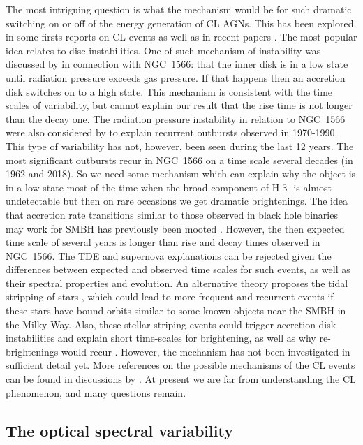 \documentclass[fleqn,usenatbib]{mnras}
\begin{document}
The most intriguing question is what the mechanism would be for such dramatic switching on or off of the energy generation of CL AGNs. This has been explored in some firsts reports on CL events as well as in recent papers \citep{Lyuty1984, Penston1984, Runnoe2016, Katebi2019}. The most popular idea relates to disc instabilities. One of such mechanism of instability \citep{Lightman1974} was discussed by \cite{Parker2019} in connection with NGC~1566: that the inner disk is in a low state until radiation pressure exceeds gas pressure. If that happens then an accretion disk switches on to a high state. This mechanism is consistent with the time scales of variability, but cannot explain our result that the rise time is not longer than the decay one. The radiation pressure instability in relation to NGC~1566 were also considered by \cite{Sniegowska2019} to explain recurrent outbursts observed in 1970-1990. This type of variability has not, however, been seen during the last 12 years. The most significant outbursts recur in NGC~1566 on a time scale several decades (in 1962 and 2018). So we need some mechanism which can explain why the object is in a low state most of the time when the broad component of H$\upbeta$ is almost undetectable but then on rare occasions we get dramatic brightenings. The idea that accretion rate transitions similar to those observed in black hole binaries may  work for SMBH has previously been mooted \citep[see e.g.,][]{Liu2020}. However, the then expected time scale of several years is longer than rise and decay times observed in NGC~1566.
The TDE and supernova explanations can be rejected given the differences between expected and observed time scales for such events, as well as their spectral properties and evolution. An alternative theory proposes the tidal stripping of stars \citep{Campana15, Ivanov-Chernyakova06}, which could lead to more frequent and recurrent events \citep{Komossa17} if these stars have bound orbits similar to some known objects near the SMBH in the Milky Way. Also, these stellar striping events could trigger accretion disk instabilities and explain short time-scales for brightening, as well as why re-brightenings would recur \citep[see e.g.,][]{Ivanov2018}. However, the mechanism has not been investigated in sufficient detail yet.  More references on the possible mechanisms of the CL events can be found in discussions by \cite{MacLeod2019,Runnoe2016, Ruan2019}.  At present we are far from understanding the CL phenomenon, and many questions remain. 

\subsection{The optical spectral variability}
\end{document}
